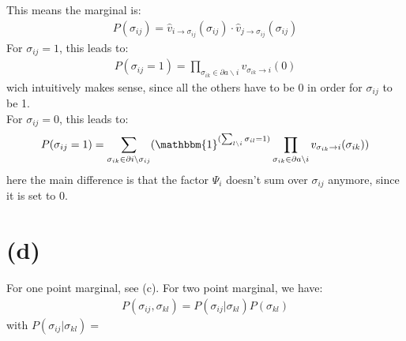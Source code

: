 \documentclass[a4paper]{scrartcl}
\begin{document}
This means the marginal is:
\begin{align}
    P(\sigma_{ij}) = \hat{v}_{i \rightarrow \sigma_{ij}}(\sigma_{ij}) \cdot \hat{v}_{j \rightarrow \sigma_{ij}}(\sigma_{ij})
\end{align}
For $\sigma_{ij}=1$, this leads to:
\begin{align}
    P(\sigma_{ij}=1) =  \prod_{\sigma_{ik} \in \partial a \backslash i} v_{\sigma_{ik} \rightarrow i}(0)
\end{align}
wich intuitively makes sense, since all the others have to be 0 in order for $\sigma_{ij}$ to be 1.\\
For $\sigma_{ij}=0$, this leads to:
\begin{align}
    P(\sigma_{ij}=1) = \sum_{\sigma_{ik} \in \partial i \backslash \sigma_{ij}} (\mathbbm{1}^{(\sum_{l \backslash i} \sigma_{il} = 1)} \prod_{\sigma_{ik} \in \partial a \backslash i} v_{\sigma_{ik} \rightarrow i}(\sigma_{ik}))\\
\end{align}
here the main difference is that the factor $\Psi_{i}$ doesn't sum over $\sigma_{ij}$ anymore, since it is set to 0.

\section*{(d)}
For one point marginal, see (c). For two point marginal, we have:
\begin{align}
    P(\sigma_{ij}, \sigma_{kl}) = P(\sigma_{ij} \vert \sigma_{kl}) P(\sigma_{kl})
\end{align}
with $P(\sigma_{ij} \vert \sigma_{kl}) = $
\end{document}
